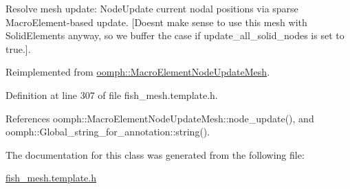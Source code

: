 Resolve mesh update\+: Node\+Update current nodal positions via sparse Macro\+Element-\/based update. \mbox{[}Doesn\textquotesingle{}t make sense to use this mesh with Solid\+Elements anyway, so we buffer the case if update\+\_\+all\+\_\+solid\+\_\+nodes is set to true.\mbox{]}. 



Reimplemented from \hyperlink{classoomph_1_1MacroElementNodeUpdateMesh_ab5271c4514bcd236271307361423ac9d}{oomph\+::\+Macro\+Element\+Node\+Update\+Mesh}.



Definition at line 307 of file fish\+\_\+mesh.\+template.\+h.



References oomph\+::\+Macro\+Element\+Node\+Update\+Mesh\+::node\+\_\+update(), and oomph\+::\+Global\+\_\+string\+\_\+for\+\_\+annotation\+::string().



The documentation for this class was generated from the following file\+:\begin{DoxyCompactItemize}
\item 
\hyperlink{fish__mesh_8template_8h}{fish\+\_\+mesh.\+template.\+h}\end{DoxyCompactItemize}
